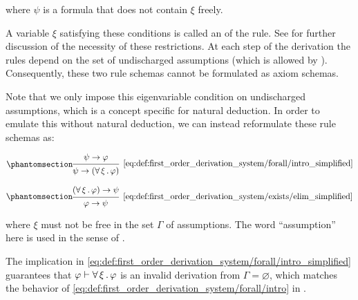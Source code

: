 \begin{definition}
\begin{thmenum}
    where \( \psi \) is a formula that does not contain \( \xi \) freely.

    A variable \( \xi \) satisfying these conditions is called an  of the rule. See  for further discussion of the necessity of these restrictions. At each step of the derivation the rules depend on the set of undischarged assumptions (which is allowed by ). Consequently, these two rule schemas cannot be formulated as axiom schemas.

     Note that we only impose this eigenvariable condition on undischarged assumptions, which is a concept specific for natural deduction. In order to emulate this without natural deduction, we can instead reformulate these rule schemas as:

    \begin{minipage}{0.45\textwidth}
      \begin{equation*}\taglabel[\textrm{R} \( \widetilde \forall^+ \)]{eq:def:first_order_derivation_system/forall/intro_simplified}
        \begin{prooftree}
          \hypo{ \psi \rightarrow \varphi }
          \infer1[\ref{eq:def:first_order_derivation_system/forall/intro_simplified}]{ \psi \rightarrow (\qforall \xi \varphi) }
        \end{prooftree}
      \end{equation*}
    \end{minipage}
    \hfill
    \begin{minipage}{0.45\textwidth}
      \begin{equation*}\taglabel[\textrm{R} \( \widetilde \exists^- \)]{eq:def:first_order_derivation_system/exists/elim_simplified}
        \begin{prooftree}
          \hypo{ (\qforall \xi \varphi) \rightarrow \psi }
          \infer1[\ref{eq:def:first_order_derivation_system/exists/elim_simplified}]{ \varphi \rightarrow \psi }
        \end{prooftree}
      \end{equation*}
    \end{minipage}

    where \( \xi \) must not be free in the set \( \Gamma \) of assumptions. The word \enquote{assumption} here is used in the sense of .

    The implication in \eqref{eq:def:first_order_derivation_system/forall/intro_simplified} guarantees that \( \varphi \vdash \forall \thinspace \xi \thinspace . \thinspace \varphi \) is an invalid derivation from \( \Gamma = \varnothing \), which matches the behavior of \ref{eq:def:first_order_derivation_system/forall/intro} in .


\end{thmenum}
\end{definition}

